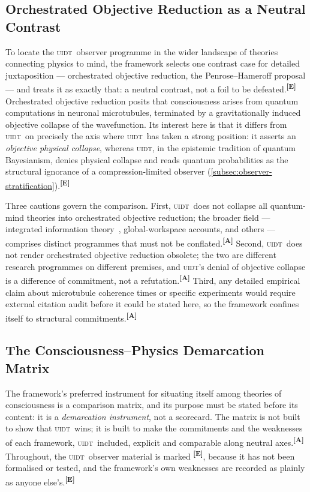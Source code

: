 \documentclass[12pt,a4paper,twoside]{article}
\theoremstyle{plain}
\theoremstyle{definition}
\theoremstyle{remark}
\newcommand{\UIDT}{\textsc{uidt}}
\newcommand{\catmark}[1]{\textsuperscript{\textsf{\textbf{[#1]}}}}
\begin{document}
\subsection{Orchestrated Objective Reduction as a Neutral Contrast}
\label{subsec:orch-or}

To locate the \UIDT\ observer programme in the wider landscape of theories
connecting physics to mind, the framework selects one contrast case for
detailed juxtaposition --- orchestrated objective reduction, the
Penrose--Hameroff proposal --- and treats it as exactly that: a neutral
contrast, not a foil to be defeated.\catmark{E} Orchestrated objective
reduction posits that consciousness arises from quantum computations in
neuronal microtubules, terminated by a gravitationally induced objective
collapse of the wavefunction. Its interest here is that it differs from
\UIDT\ on precisely the axis where \UIDT\ has taken a strong position: it
asserts an \emph{objective physical collapse}, whereas \UIDT, in the
epistemic tradition of quantum Bayesianism, denies physical collapse and
reads quantum probabilities as the structural ignorance of a
compression-limited observer (\cref{subsec:observer-stratification}).\catmark{E}

Three cautions govern the comparison. First, \UIDT\ does not collapse all
quantum-mind theories into orchestrated objective reduction; the broader
field --- integrated information theory~\cite{tononi2004}, global-workspace
accounts, and others --- comprises distinct programmes that must not be
conflated.\catmark{A} Second, \UIDT\ does not render orchestrated objective
reduction obsolete; the two are different research programmes on different
premises, and \UIDT's denial of objective collapse is a difference of
commitment, not a refutation.\catmark{A} Third, any detailed empirical
claim about microtubule coherence times or specific experiments would
require external citation audit before it could be stated here, so the
framework confines itself to structural commitments.\catmark{A}

\subsection{The Consciousness--Physics Demarcation Matrix}
\label{subsec:demarcation-matrix}

The framework's preferred instrument for situating itself among theories of
consciousness is a comparison matrix, and its purpose must be stated before
its content: it is a \emph{demarcation instrument}, not a scorecard. The
matrix is not built to show that \UIDT\ wins; it is built to make the
commitments and the weaknesses of each framework, \UIDT\ included, explicit
and comparable along neutral axes.\catmark{A} Throughout, the \UIDT\
observer material is marked \catmark{E}, because it has not been formalised
or tested, and the framework's own weaknesses are recorded as plainly as
anyone else's.\catmark{E}
\end{document}

